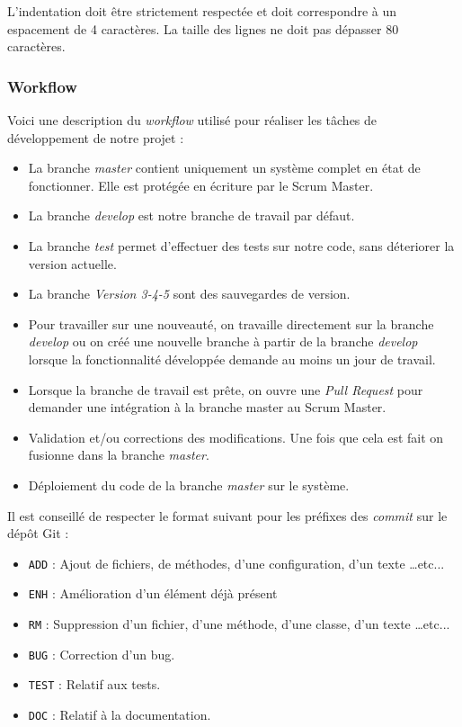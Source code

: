 \documentclass[10pt,a4paper]{article}
\begin{document}
L'indentation doit être strictement respectée et doit correspondre à un espacement de 4 caractères. La taille des lignes ne doit pas dépasser 80 caractères.


\subsubsection{Workflow}

Voici une description du \textit{workflow} utilisé pour réaliser les tâches de développement de notre projet :
\begin{itemize}
\item La branche \textit{master} contient uniquement un système complet en état de fonctionner. Elle est protégée en écriture par le Scrum Master.
\item La branche \textit{develop} est notre branche de travail par défaut.
\item La branche \textit{test} permet d'effectuer des tests sur notre code, sans déteriorer la version actuelle.
\item La branche \textit{Version 3-4-5} sont des sauvegardes de version.
\item Pour travailler sur une nouveauté, on travaille directement sur la branche \textit{develop} ou on créé une nouvelle branche à partir de la branche \textit{develop} lorsque la fonctionnalité développée demande au moins un jour de travail.
\item Lorsque la branche de travail est prête, on ouvre une \textit{Pull Request} pour demander une intégration à la branche master au Scrum Master.
\item Validation et/ou corrections des modifications. Une fois que cela est fait on fusionne dans la branche \textit{master}.
\item Déploiement du code de la branche \textit{master} sur le système.
\end{itemize}

Il est conseillé de respecter le format suivant pour les préfixes des \textit{commit} sur le dépôt Git :
\begin{itemize}

\item \verb|ADD| : Ajout de fichiers, de méthodes, d'une configuration, d'un texte \ldots etc...
\item \verb|ENH| : Amélioration d'un élément déjà présent
\item \verb|RM| : Suppression d'un fichier, d'une méthode, d'une classe, d'un texte \ldots etc...
\item \verb|BUG| : Correction d'un bug.
\item \verb|TEST| : Relatif aux tests.
\item \verb|DOC| : Relatif à la documentation.
\end{itemize}
\end{document}
